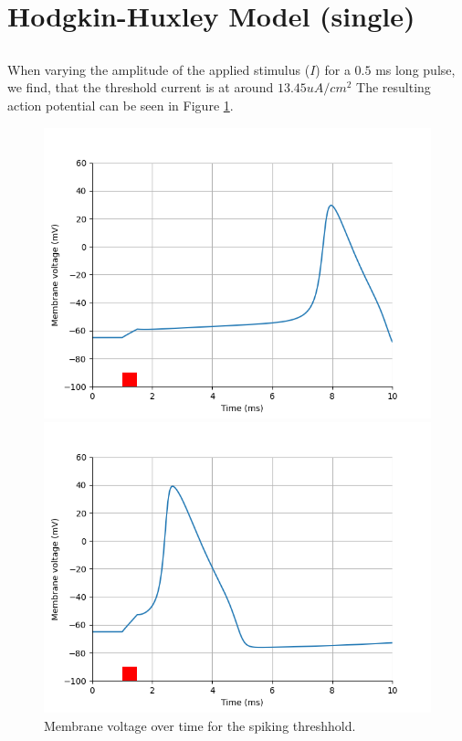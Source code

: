 \documentclass{article}
\begin{document}
    \section{Hodgkin-Huxley Model (single)}

    \subsection{}

    When varying the amplitude of the applied stimulus ($I$) for a $0.5$ ms long pulse, we find, that the threshold current is at around $13.45 uA/cm^2$
    The resulting action potential can be seen in Figure \ref{fig:threshold_amplitudes}.

    \begin{figure}[htbp]
        \centering
        \begin{minipage}[b]{0.49\textwidth}
            \includegraphics[width=\textwidth]{threshold(13.45).png}
            \caption{Membrane voltage over time for the spiking threshhold.}
            \label{fig:threshold_amplitudes}
        \end{minipage}
        \hfill
        \begin{minipage}[b]{0.49\textwidth}
            \includegraphics[width=\textwidth]{double_threshold(26.9).png}

\end{minipage}
\end{figure}
\end{document}
